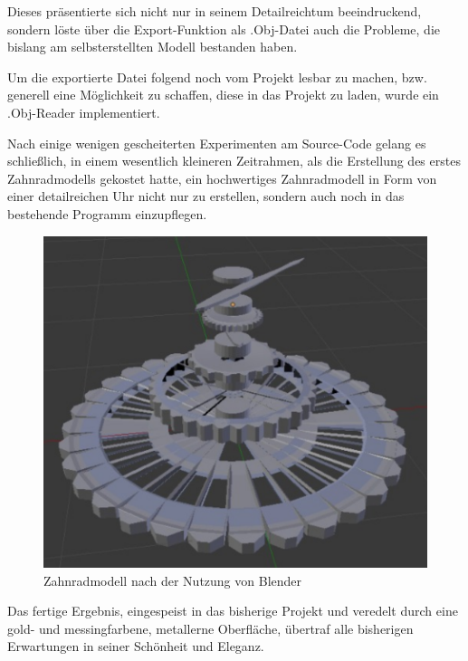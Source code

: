\documentclass{article}
\begin{document}
Dieses präsentierte sich nicht nur in seinem Detailreichtum beeindruckend, sondern löste über die Export-Funktion als .Obj-Datei auch die Probleme, die bislang am selbsterstellten Modell bestanden haben. 

Um die exportierte Datei folgend noch vom Projekt lesbar zu machen, bzw. generell eine Möglichkeit zu schaffen, diese in das Projekt zu laden, wurde ein .Obj-Reader implementiert. 

Nach einige wenigen gescheiterten Experimenten am Source-Code gelang es schließlich, in einem wesentlich kleineren Zeitrahmen, als die Erstellung des erstes Zahnradmodells gekostet hatte, ein hochwertiges Zahnradmodell in Form von einer detailreichen Uhr nicht nur zu erstellen, sondern auch noch in das bestehende Programm einzupflegen. 


\begin{figure}[h!]
\centering
\includegraphics[scale=0.7]{Final_Clock_Blender.png}
\caption{Zahnradmodell nach der Nutzung von Blender}
\label{fig:clock_blender}
\end{figure}

Das fertige Ergebnis, eingespeist in das bisherige Projekt und veredelt durch eine gold- und messingfarbene, metallerne Oberfläche, übertraf alle bisherigen Erwartungen in seiner Schönheit und Eleganz. 
\end{document}
